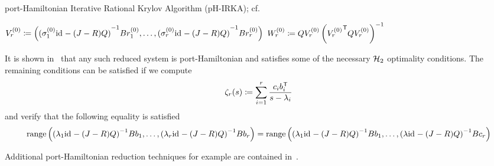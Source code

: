 \begin{algorithm}\label{alg:ph-irka}
    \caption{port-Hamiltonian Iterative Rational Krylov Algorithm (pH-IRKA); cf.~\cite[Algorithm~1]{Gugercin2012}}
    $V_r^{(0)} \coloneqq \left( {(\sigma_1^{(0)} \text{id}_{} - (J - R) Q)}^{-1} B r_1^{(0)}, \dots, {(\sigma_r^{(0)} \text{id}_{} - (J - R) Q)}^{-1} B r_r^{(0)} \right)$\;
    $W_r^{(0)} \coloneqq Q V_r^{(0)} \left( {V_r^{(0)}}^{\mkern1mu \mathsf{T}} Q V_r^{(0)} \right)^{-1}$\;
\end{algorithm}

It is shown in~\cite[Theorem~11]{Gugercin2012} that any such reduced system is port-Hamiltonian and satisfies some of the necessary $\mathcal{H}_2$ optimality conditions.
The remaining conditions can be satisfied if we compute
\begin{equation*}
    \zeta_r(s) \coloneqq \sum\limits_{i = 1}^r \frac{c_i b_i^{\mkern1mu \mathsf{T}}}{s - \lambda_i}
\end{equation*}
and verify that the following equality is satisfied
\begin{equation*}
    \mathop{}\!\mathrm{range}\left({(\lambda_1 \text{id}_{} - (J - R) Q)}^{-1} B b_1, \dots, {(\lambda_r \text{id}_{} - (J - R) Q)}^{-1} B b_r\right) = \mathop{}\!\mathrm{range}\left({(\lambda_1 \text{id}_{} - (J - R) Q)}^{-1} B b_1, \dots, {(\lambda \text{id}_{} - (J - R) Q)}^{-1} B c_r\right)
\end{equation*}


\begin{remark}
    Additional port-Hamiltonian reduction techniques for example are contained in~\cite{Polyuga2010, Chaturantabut2016, Cherifi2019, BGD2020}.
\end{remark}
